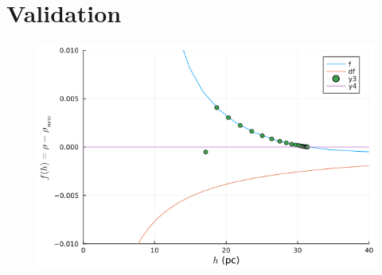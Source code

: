\documentclass[12pt]{article}
\begin{document}
\citep{monaghan92}

\section{Validation}
\begin{figure}
    \includegraphics[width=\textwidth]{density.png}
\end{figure}

\newpage


\end{document}
